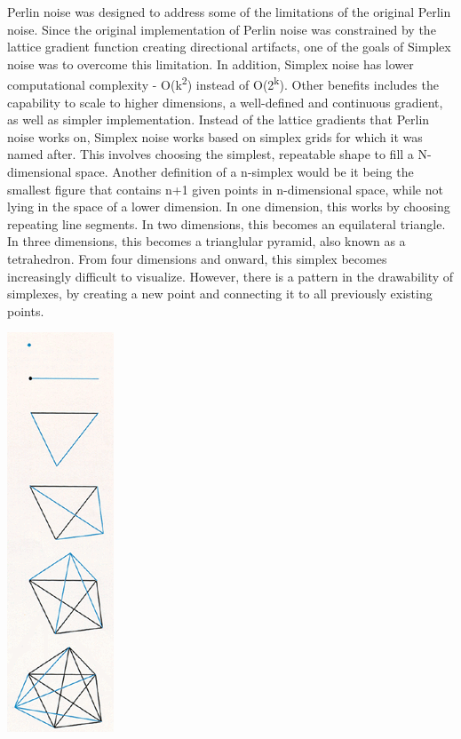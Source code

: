 \documentclass[10pt]{report}
\begin{document}
		Perlin noise was designed to address some of the limitations of the original Perlin noise. Since the original implementation of Perlin noise was constrained by the lattice gradient function creating directional artifacts, one of the goals of Simplex noise was to overcome this limitation. In addition, Simplex noise has lower computational complexity - O(k\textsuperscript{2}) instead of O(2\textsuperscript{k})\cite{sheet-simplex}. Other benefits includes the capability to scale to higher dimensions, a well-defined and continuous gradient, as well as simpler implementation. Instead of the lattice gradients that Perlin noise works on, Simplex noise works based on simplex grids for which it was named after. This involves choosing the simplest, repeatable shape to fill a N-dimensional space. Another definition of a n-simplex would be it being the smallest figure that contains n+1 given points in n-dimensional space, while not lying in the space of a lower dimension. In one dimension, this works by choosing repeating line segments. In two dimensions, this becomes an equilateral triangle. In three dimensions, this becomes a trianglular pyramid, also known as a tetrahedron. From four dimensions and onward, this simplex becomes increasingly difficult to visualize. However, there is a pattern in the drawability of simplexes, by creating a new point and connecting it to all previously existing points.
		
		\begin{minipage}{\textwidth}
			\centering
			\includegraphics[scale=.75]{six simplexes}
			\label{fig:fig2}
		\end{minipage}
	
\end{document}

